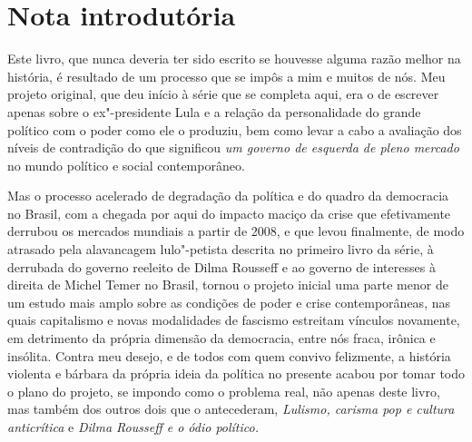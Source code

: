 















\chapter{Nota introdutória}

Este livro, que nunca deveria ter sido escrito se houvesse alguma razão
melhor na história, é resultado de um processo que se impôs a mim e
muitos de nós. Meu projeto original, que deu início à série que se
completa aqui, era o de escrever apenas sobre o ex"-presidente Lula e a
relação da personalidade do grande político com o poder como ele o
produziu, bem como levar a cabo a avaliação dos níveis de contradição do
que significou \emph{um governo de esquerda de pleno mercado} no mundo
político e social contemporâneo.

Mas o processo acelerado de degradação da política e do quadro da
democracia no Brasil, com a chegada por aqui do impacto maciço da crise
que efetivamente derrubou os mercados mundiais a partir de 2008, e que
levou finalmente, de modo atrasado pela alavancagem lulo"-petista
descrita no primeiro livro da série, à derrubada do governo reeleito de
Dilma Rousseff e ao governo de interesses à direita de Michel Temer no
Brasil, tornou o projeto inicial uma parte menor de um estudo mais amplo
sobre as condições de poder e crise contemporâneas, nas quais
capitalismo e novas modalidades de fascismo estreitam vínculos
novamente, em detrimento da própria dimensão da democracia, entre nós
fraca, irônica e insólita. Contra meu desejo, e de todos com quem
convivo felizmente, a história violenta e bárbara da própria ideia da
política no presente acabou por tomar todo o plano do projeto, se
impondo como o problema real, não apenas deste livro, mas também dos
outros dois que o antecederam, \emph{Lulismo, carisma pop e cultura
anticrítica} e \emph{Dilma Rousseff e o ódio político. }

